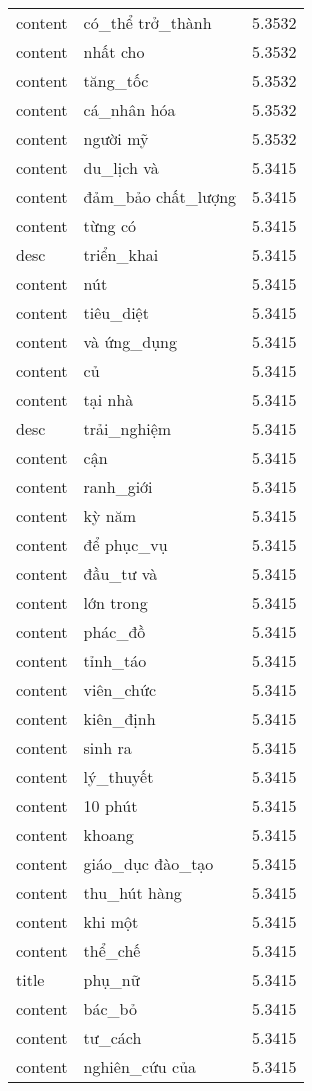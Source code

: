 \documentclass{article}
\begin{document}
\begin{tabular}{lll}
content & có\_thể trở\_thành & 5.3532\\
content & nhất cho & 5.3532\\
content & tăng\_tốc & 5.3532\\
content & cá\_nhân hóa & 5.3532\\
content & người mỹ & 5.3532\\
content & du\_lịch và & 5.3415\\
content & đảm\_bảo chất\_lượng & 5.3415\\
content & từng có & 5.3415\\
desc & triển\_khai & 5.3415\\
content & nút & 5.3415\\
content & tiêu\_diệt & 5.3415\\
content & và ứng\_dụng & 5.3415\\
content & củ & 5.3415\\
content & tại nhà & 5.3415\\
desc & trải\_nghiệm & 5.3415\\
content & cận & 5.3415\\
content & ranh\_giới & 5.3415\\
content & kỳ năm & 5.3415\\
content & để phục\_vụ & 5.3415\\
content & đầu\_tư và & 5.3415\\
content & lớn trong & 5.3415\\
content & phác\_đồ & 5.3415\\
content & tỉnh\_táo & 5.3415\\
content & viên\_chức & 5.3415\\
content & kiên\_định & 5.3415\\
content & sinh ra & 5.3415\\
content & lý\_thuyết & 5.3415\\
content & 10 phút & 5.3415\\
content & khoang & 5.3415\\
content & giáo\_dục đào\_tạo & 5.3415\\
content & thu\_hút hàng & 5.3415\\
content & khi một & 5.3415\\
content & thể\_chế & 5.3415\\
title & phụ\_nữ & 5.3415\\
content & bác\_bỏ & 5.3415\\
content & tư\_cách & 5.3415\\
content & nghiên\_cứu của & 5.3415\\

\end{tabular}
\end{document}

